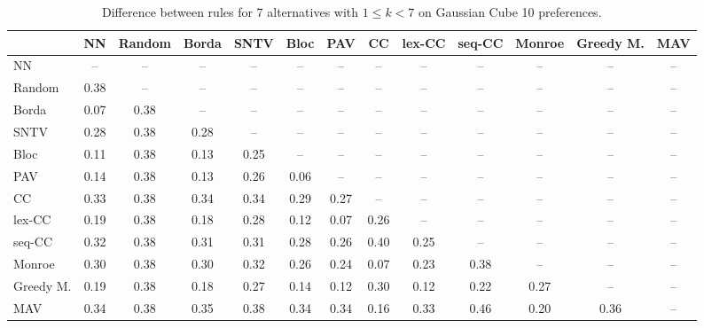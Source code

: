 
\begin{table*}[h!]
\centering
\begin{tabular}{lcccccccccccc}
\toprule
 & NN & Random & Borda & SNTV & Bloc & PAV & CC & lex-CC & seq-CC & Monroe & Greedy M. & MAV \\
\midrule
NN & -- & -- & -- & -- & -- & -- & -- & -- & -- & -- & -- & -- \\
Random & 0.38 & -- & -- & -- & -- & -- & -- & -- & -- & -- & -- & -- \\
Borda & 0.07 & 0.38 & -- & -- & -- & -- & -- & -- & -- & -- & -- & -- \\
SNTV & 0.28 & 0.38 & 0.28 & -- & -- & -- & -- & -- & -- & -- & -- & -- \\
Bloc & 0.11 & 0.38 & 0.13 & 0.25 & -- & -- & -- & -- & -- & -- & -- & -- \\
PAV & 0.14 & 0.38 & 0.13 & 0.26 & 0.06 & -- & -- & -- & -- & -- & -- & -- \\
CC & 0.33 & 0.38 & 0.34 & 0.34 & 0.29 & 0.27 & -- & -- & -- & -- & -- & -- \\
lex-CC & 0.19 & 0.38 & 0.18 & 0.28 & 0.12 & 0.07 & 0.26 & -- & -- & -- & -- & -- \\
seq-CC & 0.32 & 0.38 & 0.31 & 0.31 & 0.28 & 0.26 & 0.40 & 0.25 & -- & -- & -- & -- \\
Monroe & 0.30 & 0.38 & 0.30 & 0.32 & 0.26 & 0.24 & 0.07 & 0.23 & 0.38 & -- & -- & -- \\
Greedy M. & 0.19 & 0.38 & 0.18 & 0.27 & 0.14 & 0.12 & 0.30 & 0.12 & 0.22 & 0.27 & -- & -- \\
MAV & 0.34 & 0.38 & 0.35 & 0.38 & 0.34 & 0.34 & 0.16 & 0.33 & 0.46 & 0.20 & 0.36 & -- \\
\bottomrule
\end{tabular}

\caption{Difference between rules for 7 alternatives with $1 \leq k < 7$ on Gaussian Cube 10 preferences.}
\end{table*}
